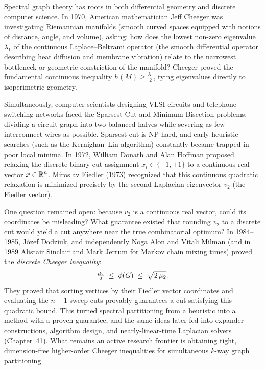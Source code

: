 \begin{historybox}
Spectral graph theory has roots in both differential geometry and discrete computer science.
In 1970, American mathematician Jeff Cheeger was investigating Riemannian manifolds (smooth curved spaces equipped with notions of distance, angle, and volume), asking:
how does the lowest non-zero eigenvalue $\lambda_1$ of the continuous Laplace--Beltrami operator (the smooth differential operator describing heat diffusion and membrane vibration)
relate to the narrowest bottleneck or geometric constriction of the manifold? Cheeger proved
the fundamental continuous inequality $h(M) \ge \tfrac{\lambda_1}{2}$, tying eigenvalues
directly to isoperimetric geometry.

Simultaneously, computer scientists designing VLSI circuits and telephone switching networks
faced the Sparsest Cut and Minimum Bisection problems: dividing a circuit graph into two
balanced halves while severing as few interconnect wires as possible. Sparsest cut is NP-hard,
and early heuristic searches (such as the Kernighan--Lin algorithm) constantly became trapped
in poor local minima. In 1972, William Donath and Alan Hoffman proposed relaxing the discrete
binary cut assignment $x_i \in \{-1, +1\}$ to a continuous real vector $x \in \mathbb{R}^n$.
Miroslav Fiedler (1973) recognized that this continuous quadratic relaxation is minimized
precisely by the second Laplacian eigenvector $v_2$ (the Fiedler vector).

One question remained open: because $v_2$ is a continuous real vector, could its
coordinates be misleading? What guarantee existed that rounding $v_2$ to a discrete cut
would yield a cut anywhere near the true combinatorial optimum?
In 1984--1985, J\'ozef Dodziuk, and independently Noga Alon and Vitali Milman (and in 1989 Alistair Sinclair
and Mark Jerrum for Markov chain mixing times) proved the \emph{discrete Cheeger inequality}:
\[
  \tfrac{\mu_2}{2} \;\le\; \phi(G) \;\le\; \sqrt{2\,\mu_2} .
\]
They proved that sorting vertices by their Fiedler vector coordinates and evaluating the $n-1$
sweep cuts provably guarantees a cut satisfying this quadratic bound. This turned spectral
partitioning from a heuristic into a method with a proven guarantee, and the same ideas
later fed into expander constructions, algorithm design, and nearly-linear-time
Laplacian solvers (Chapter~41). What remains an active research frontier
is obtaining tight, dimension-free higher-order Cheeger inequalities for simultaneous $k$-way graph partitioning.
\end{historybox}

